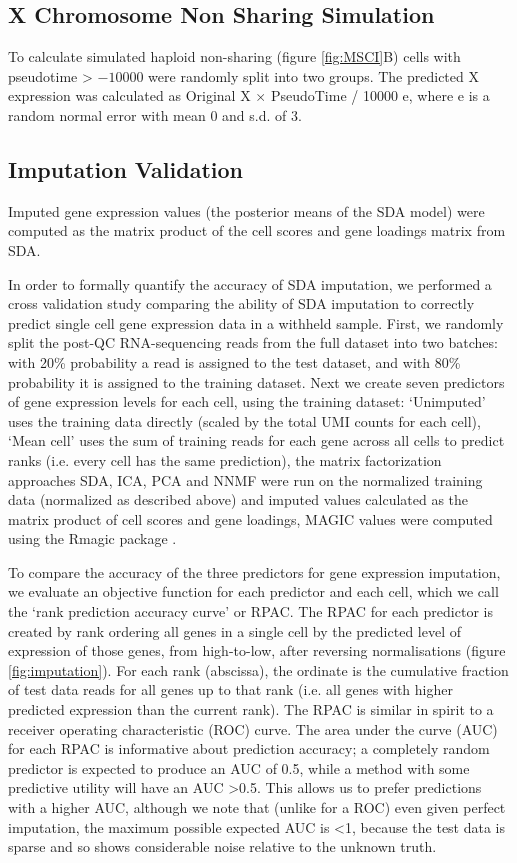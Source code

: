 \subsection{X Chromosome Non Sharing Simulation}
\label{sec:msci_methods}
To calculate simulated haploid non-sharing (figure \ref{fig:MSCI}B) cells with pseudotime > $-10000$ were randomly split into two groups. The predicted X expression was calculated as Original X $\times$ PseudoTime / 10000  e, where e is a random normal error with mean 0 and s.d. of 3.

\subsection{Imputation Validation}
\label{sec:imputation_methods}
Imputed gene expression values (the posterior means of the SDA model) were computed as the matrix product of the cell scores and gene loadings matrix from SDA.

In order to formally quantify the accuracy of SDA imputation, we performed a cross validation study comparing the ability of SDA imputation to correctly predict single cell gene expression data in a withheld sample. First, we randomly split the post-QC RNA-sequencing reads from the full dataset into two batches: with 20\% probability a read is assigned to the test dataset, and with 80\% probability it is assigned to the training dataset. Next we create seven predictors of gene expression levels for each cell, using the training dataset: ‘Unimputed’ uses the training data directly (scaled by the total UMI counts for each cell), ‘Mean cell’ uses the sum of training reads for each gene across all cells to predict ranks (i.e. every cell has the same prediction), the matrix factorization approaches SDA, ICA, PCA and NNMF were run on the normalized training data (normalized as described above) and imputed values calculated as the matrix product of cell scores and gene loadings, MAGIC values were computed using the Rmagic package \parencite{vanDijk2018Recovering}.

To compare the accuracy of the three predictors for gene expression imputation, we evaluate an objective function for each predictor and each cell, which we call the ‘rank prediction accuracy curve’ or RPAC. The RPAC for each predictor is created by rank ordering all genes in a single cell by the predicted level of expression of those genes, from high-to-low, after reversing normalisations (figure \ref{fig:imputation}). For each rank (abscissa), the ordinate is the cumulative fraction of test data reads for all genes up to that rank (i.e. all genes with higher predicted expression than the current rank). The RPAC is similar in spirit to a receiver operating characteristic (ROC) curve. The area under the curve (AUC) for each RPAC is informative about prediction accuracy; a completely random predictor is expected to produce an AUC of 0.5, while a method with some predictive utility will have an AUC >0.5. This allows us to prefer predictions with a higher AUC, although we note that (unlike for a ROC) even given perfect imputation, the maximum possible expected AUC is <1, because the test data is sparse and so shows considerable noise relative to the unknown truth.

